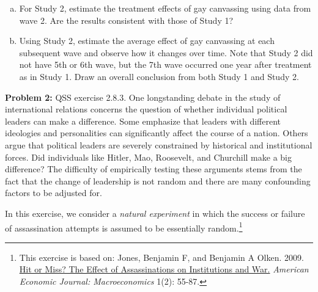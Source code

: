 \documentclass[11pt]{article}
\begin{document}
\begin{enumerate}[a.]
{  Contact} to examine whether randomization was appropriately
  conducted.  Use the baseline support from wave 1 for this analysis.
  \item For Study 2, estimate the treatment effects of gay canvassing
  using data from wave 2.  Are the results consistent with those of
  Study 1?
  \item Using Study 2, estimate the average effect of gay canvassing at
  each subsequent wave and observe how it changes over time.  Note
  that Study 2 did not have 5th or 6th wave, but the 7th wave occurred
  one year after treatment as in Study 1.  Draw an overall conclusion
  from both Study 1 and Study 2.
\end{enumerate}

\vspace{7mm}
\noindent \textbf{Problem 2:} QSS exercise 2.8.3. One longstanding debate in the study of international relations
concerns the question of whether individual political leaders can make
a difference.  Some emphasize that leaders with different ideologies
and personalities can significantly affect the course of a nation.
Others argue that political leaders are severely constrained by
historical and institutional forces.  Did individuals like Hitler,
Mao, Roosevelt, and Churchill make a big difference?  The difficulty
of empirically testing these arguments stems from the fact that the
change of leadership is not random and there are many confounding
factors to be adjusted for.

In this exercise, we consider a \textit{natural experiment} in which the
success or failure of assassination attempts is assumed to be
essentially random.\footnote{This exercise is based on:
Jones, Benjamin F, and Benjamin A Olken. 2009. \href{http://dx.doi.org/10.1257/mac.1.2.55}{Hit or Miss? 
 The Effect of Assassinations on Institutions and 
 War.} \textit{American Economic Journal: Macroeconomics} 1(2): 55-87. }
 
\end{document}
